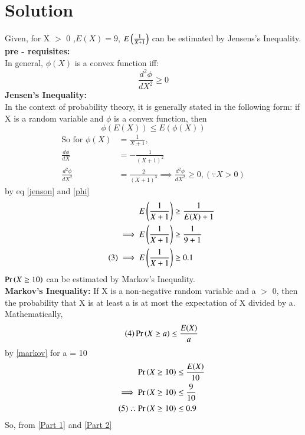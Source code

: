 \documentclass[journal,12pt,twocolumn]{IEEEtran}
\begin{document}
\section{\textbf{Solution}}
Given, for X $>$ 0 ,$E(X) = 9$, $E\left(\frac{1}{X+1}\right)$ can be estimated by Jensens's Inequality. \\
\textbf{pre - requisites:}\\
In general, $\phi(X)$ is a convex function iff:
\begin{equation*}
    \frac{d^2 \phi}{dX^2} \ge 0
\end{equation*}
\textbf{Jensen's Inequality:}\\
In the context of probability theory, it is generally stated in the following form: if X is a random variable and $\phi$ is a convex function, then
\begin{equation*}
\tag{1} \label{jenson}
    \phi(E(X)) \le E(\phi(X))
\end{equation*}
\begin{align*}
    \text{So for } \phi(X) &= \frac{1}{X+1}, \\
                \frac{d\phi}{dX} &= - \frac{1}{(X+1)^{2}} \\
                \tag{2} \label{phi}
                \frac{d^2 \phi}{dX^2} &= \frac{2}{(X+1)^{3}} 
    \implies \frac{d^2 \phi}{dX^2} \ge 0,(\because X>0 )
\end{align*}
by eq \eqref{jenson} and \eqref{phi}
\begin{align*}
    E\left(\frac{1}{X+1}\right) &\ge \frac{1}{E(X)+1} \\
    \implies E\left(\frac{1}{X+1}\right) &\ge \frac{1}{9 + 1} \\
    \tag{3} \label{Part 1}
    \implies E\left(\frac{1}{X+1}\right) &\ge 0.1
\end{align*}
$\Pr\left(X \ge 10\right)$ can be estimated by Markov's Inequality.\\
\textbf{Markov's Inequality:}
If X is a non-negative random variable and a $>$ 0, then the probability that X is at least a is at most the expectation of X divided by a. \\
Mathematically,
\begin{equation*}
    \tag{4} \label{markov}
    \Pr\left(X \ge a\right) \le \frac{E(X)}{a}
\end{equation*}
by \eqref{markov} for a = 10
\begin{align*}
    \Pr\left(X \ge 10\right) &\le \frac{E(X)}{10} \\
    \implies \Pr\left(X \ge 10\right) &\le \frac{9}{10} \\
    \tag{5} \label{Part 2}
   \therefore \Pr\left(X \ge 10\right) &\le 0.9
\end{align*}
So, from \eqref{Part 1} and \eqref{Part 2} \\
\begin{center}
\end{center}
\end{document}
